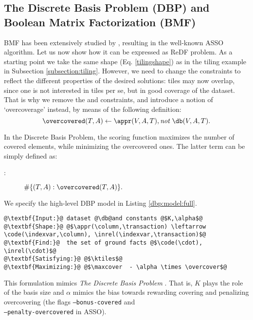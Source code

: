\subsection{The Discrete Basis Problem (DBP) and Boolean Matrix Factorization (BMF)}
\label{subsection:bmf}
BMF has been extensively studied by \cite{conf/icdm/Miettinen12}, resulting in the well-known ASSO algorithm. Let us now show how it can be expressed as ReDF problem. As a starting point we take the same shape (Eq. \ref{tilingshape}) as in the tiling example in Subsection \ref{subsection:tiling}. However, we need to change the constraints to reflect the different properties of the desired solutions: tiles may now overlap, since one is not interested in tiles per se, but in good coverage of the dataset. That is why we remove 
the \intersectionConstraint and \overcoverageConstraint constraints, and introduce a notion of `overcoverage' instead, by means of the following definition:
\begin{equation*}
\overcovered(T,A) \leftarrow  \appr(V,A,T), \textit{not}~ \db(V,A,T). %
\end{equation*}

In the Discrete Basis Problem, the scoring function maximizes the number of covered elements, while minimizing the overcovered ones. The latter term can be simply defined as: 
\begin{description}
\item[\overcoverage:] $\#\{ (T,A) : \overcovered(T,A) \}. $
\end{description}
We specify the high-level DBP model in Listing \ref{dbp:model:full}.
\begin{lstlisting}[style=model, caption=ReDF Model for the Discrete Basis Problem, label=dbp:model:full]
@\textbf{Input:}@ dataset @\db@and constants @$K,\alpha$@
@\textbf{Shape:}@ @$\appr(\column,\transaction) \leftarrow \code(\indexvar,\column), \inrel(\indexvar,\transaction)$@
@\textbf{Find:}@  the set of ground facts @$\code(\cdot), \inrel(\cdot)$@
@\textbf{Satisfying:}@ @$\ktiles$@
@\textbf{Maximizing:}@ @$\maxcover  - \alpha \times \overcover$@
\end{lstlisting}
This formulation mimics \textit{The Discrete Basis Problem} \citep{dbp}. That is, $K$ plays the role of the basis size and $\alpha$ mimics the bias towards rewarding covering and penalizing overcovering (the flags \texttt{--bonus-covered} and\\\texttt{--penalty-overcovered} in ASSO).

